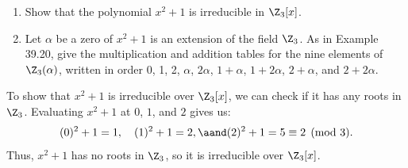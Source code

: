 \begin{problem}[39.18]
  \begin{enumerate}
    \item Show that the polynomial $x^2 + 1$ is irreducible in $\Z_3[x]$.
    \item Let $\alpha$ be a zero of $x^2 + 1$ is an extension of the field $\Z_3$. As in Example 39.20, give the multiplication and addition tables for the nine elements of $\Z_3(\alpha)$, written in order 0, 1, 2, $\alpha$, $2\alpha$, $1 + \alpha$, $1 + 2\alpha$, $2 + \alpha$, and $2 + 2\alpha$.
  \end{enumerate}
\end{problem}

\begin{solution}[(i)]
  To show that $x^2 + 1$ is irreducible over $\Z_3[x]$, we can check if it has any roots in $\Z_3$. Evaluating $x^2 + 1$ at $0$, $1$, and $2$ gives us:
  \[%
    (0)^2 + 1 = 1, \quad (1)^2 + 1 = 2, \aand (2)^2 + 1 = 5 \equiv 2 \pmod{3}
  .\]%
  Thus, $x^2 + 1$ has no roots in $\Z_3$, so it is irreducible over $\Z_3[x]$.
\end{solution}

